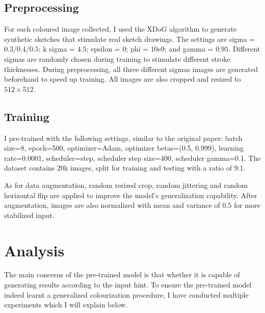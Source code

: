 \subsection{Preprocessing}
For each coloured image collected, I used the XDoG\cite{winnemollerXDoGEXtendedDifferenceofGaussians2012} algorithm to generate synthetic sketches that stimulate real sketch drawings. The settings are sigma = $0.3/0.4/0.5$; k sigma = $4.5$; epsilon = $0$; phi = $10\mathrm{e}9$; and gamma = $0.95$. Different sigmas are randomly chosen during training to stimulate different stroke thicknesses. During preprocessing, all three different sigmas images are generated beforehand to speed up training. All images are also cropped and resized to $512\times512$.


\subsection{Training}
I pre-trained with the following settings, similar to the original paper: batch size=8, epoch=500, optimizer=Adam, optimizer betas=(0.5, 0.999), learning rate=0.0001, scheduler=step, scheduler step size=400, scheduler gamma=0.1. The dataset contains 20k images, split for training and testing with a ratio of 9:1.

As for data augmentation, random resized crop, random jittering and random horizontal flip are applied to improve the model's generalization capability. After augmentation, images are also normalized with mean and variance of $0.5$ for more stabilized input.

\section{Analysis}
The main concerns of the pre-trained model is that whether it is capable of generating results according to the input hint. To ensure the pre-trained model indeed learnt a generalized colourization procedure, I have conducted multiple experiments which I will explain below.

